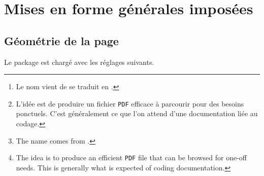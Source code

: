 \begin{abstract}
Le package 
\footnote{
    Le nom vient de  se traduit en .
}
est utilisé par son auteur pour produire de façon sémantique des documentations de packages et de classes \LaTeX\ dans un style de type tutoriel
\footnote{
    L'idée est de produire un fichier \texttt{PDF} efficace à parcourir pour des besoins ponctuels. C'est généralement ce que l'on attend d'une documentation liée au codage.
},
et avec un rendu sobre pour une lecture sur écran.


\begin{tdocnote}
     Ce package impose un style de mise en forme.
    Dans un avenir plus ou moins proche,  sera sûrement éclaté en une classe et un package.
\end{tdocnote}

\tdocsep

{\small\itshape
\textbf{Abstract.}
The  package
\footnote{
    The name comes from .
}
is used by its author to semantically produce documentation of \LaTeX\ packages and classes in a tutorial style
\footnote{
    The idea is to produce an efficient \texttt{PDF} file that can be browsed for one-off needs. This is generally what is expected of coding documentation.
},
and with a sober rendering for reading on screen.


\begin{tdocnote}
     This package imposes a formatting style. In the not-too-distant future,  will probably be split into a class and a package.
\end{tdocnote}
}
\end{abstract}


\newpage
\tableofcontents
\newpage
\section{Mises en forme générales imposées}

\subsection{Géométrie de la page}

Le package  est chargé avec les réglages suivants.


\begin{tdoclatex}[code]
\RequirePackage[
  top            = 2.5cm,
  bottom         = 2.5cm,
  left           = 2.5cm,
  right          = 2.5cm,
  marginparwidth = 2cm,
  marginparsep   = 2mm,
  heightrounded
]{geometry}
\end{tdoclatex}


